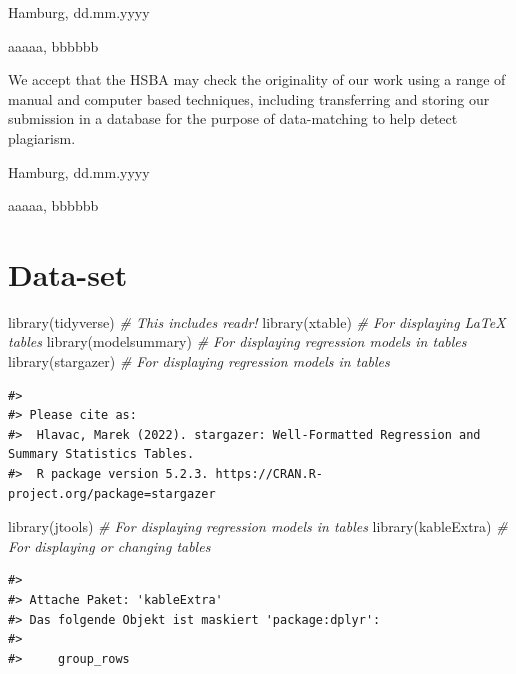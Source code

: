 \documentclass[
  11pt,
  a4paper,
  twoside]{scrbook}
\newenvironment{Shaded}{\begin{snugshade}}{\end{snugshade}}
\newcommand{\CommentTok}[1]{\textcolor[rgb]{0.56,0.35,0.01}{\textit{#1}}}
\newcommand{\FunctionTok}[1]{\textcolor[rgb]{0.00,0.00,0.00}{#1}}
\newcommand{\NormalTok}[1]{#1}
\begin{document}
Hamburg, dd.mm.yyyy

aaaaa, bbbbbb

\vspace{2.5cm}

We accept that the HSBA may check the originality of our work using a range of manual and computer based techniques, including transferring and storing our submission in a database for the purpose of data-matching to help detect plagiarism.

Hamburg, dd.mm.yyyy

aaaaa, bbbbbb

\hypertarget{data-set}{%
\chapter{Data-set}\label{data-set}}

\linespread{1}

\begin{Shaded}
\begin{Highlighting}[]
\FunctionTok{library}\NormalTok{(tidyverse) }\CommentTok{\# This includes readr!}
\FunctionTok{library}\NormalTok{(xtable) }\CommentTok{\# For displaying LaTeX tables}
\FunctionTok{library}\NormalTok{(modelsummary) }\CommentTok{\# For displaying regression models in tables}
\FunctionTok{library}\NormalTok{(stargazer) }\CommentTok{\# For displaying regression models in tables}
\end{Highlighting}
\end{Shaded}

\linespread{1}

\begin{verbatim}
#> 
#> Please cite as:
#>  Hlavac, Marek (2022). stargazer: Well-Formatted Regression and Summary Statistics Tables.
#>  R package version 5.2.3. https://CRAN.R-project.org/package=stargazer
\end{verbatim}

\linespread{1}

\begin{Shaded}
\begin{Highlighting}[]
\FunctionTok{library}\NormalTok{(jtools) }\CommentTok{\# For displaying regression models in tables}
\FunctionTok{library}\NormalTok{(kableExtra) }\CommentTok{\# For displaying or changing tables}
\end{Highlighting}
\end{Shaded}

\linespread{1}

\begin{verbatim}
#> 
#> Attache Paket: 'kableExtra'
#> Das folgende Objekt ist maskiert 'package:dplyr':
#> 
#>     group_rows
\end{verbatim}
\end{document}
